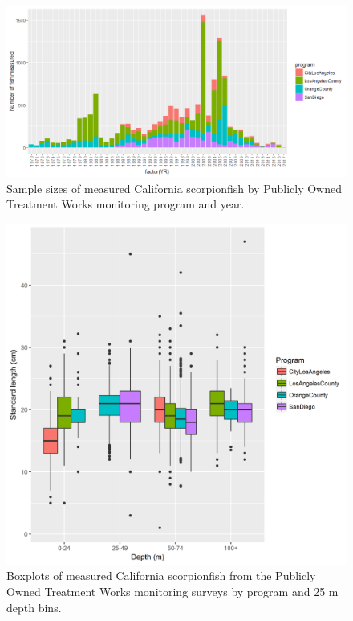 \documentclass[12pt,]{article}
\begin{document}
\begin{figure}[htbp]
\centering
\includegraphics{Figures/Fleet7_Sanitation_length_source.png}
\caption{Sample sizes of measured California scorpionfish by Publicly
Owned Treatment Works monitoring program and year.
\label{fig:Fleet7_Sanitation_lengthbydistrict}}
\end{figure}

\begin{figure}[htbp]
\centering
\includegraphics{Figures/Fleet7_Sanitation_lengthboxplots.png}
\caption{Boxplots of measured California scorpionfish from the Publicly
Owned Treatment Works monitoring surveys by program and 25 m depth bins.
\label{fig:Fleet7_Sanitation_lengthboxplots}}
\end{figure}
\end{document}
